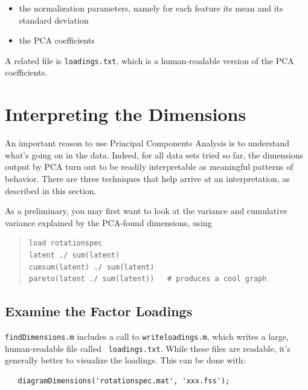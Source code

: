 \documentclass[11pt]{article}
\begin{document}
\begin{itemize}  \setlength{\itemsep}{0pt}\setlength{\parskip}{0pt}
\item the normalization parameters, namely for each feature its mean
  and its standard deviation

\item the PCA coefficients
\end{itemize}

A related file is {\tt loadings.txt}, which is a human-readable
version of the PCA coefficients.


\section{Interpreting the Dimensions}  \label{sec:interpreting}

An important reason to use Principal Components Analysis is to
understand what's going on in the data.  Indeed, for all data sets
tried so far, the dimensions output by PCA turn out to be readily
interpretable as meaningful patterns of behavior.  There are three
techniques that help arrive at an interpretation, as described in this
section.

As a preliminary, you may first want to look at the variance and
cumulative variance explained by the PCA-found dimensions, using

\begin{quote}
\begin{verbatim}
load rotationspec
latent ./ sum(latent) 
cumsum(latent) ./ sum(latent) 
pareto(latent ./ sum(latent))   # produces a cool graph
\end{verbatim}
\end{quote}


\subsection{Examine the Factor Loadings}

{\tt findDimensions.m} includes a call to {\tt writeloadings.m}, which
writes a large, human-readable file called {\tt
  loadings.txt}.  While these files are readable, it's generally better
to visualize the loadings.  This can be done with:

\begin{verbatim}
   diagramDimensions('rotationspec.mat', 'xxx.fss');
\end{verbatim}
\end{document}
